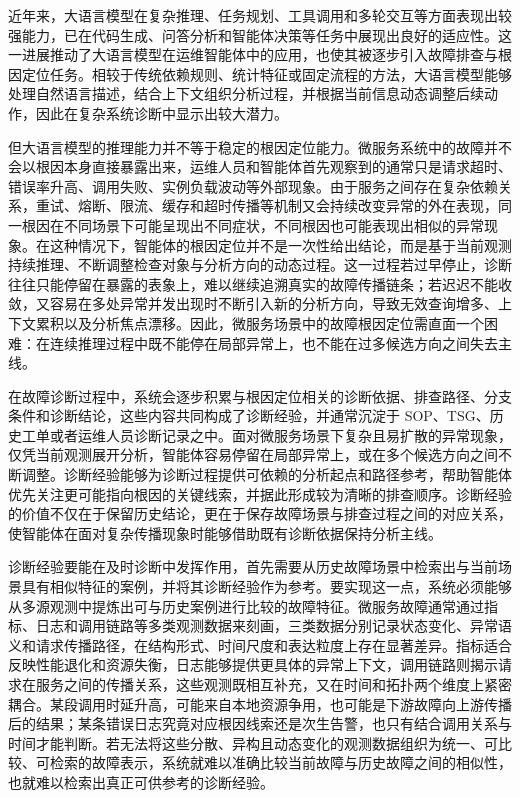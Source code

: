 近年来，大语言模型在复杂推理、任务规划、工具调用和多轮交互等方面表现出较强能力，已在代码生成、问答分析和智能体决策等任务中展现出良好的适应性\cite{yao2022react}。这一进展推动了大语言模型在运维智能体中的应用，也使其被逐步引入故障排查与根因定位任务。相较于传统依赖规则、统计特征或固定流程的方法，大语言模型能够处理自然语言描述，结合上下文组织分析过程，并根据当前信息动态调整后续动作，因此在复杂系统诊断中显示出较大潜力\cite{microservice-diagnosis-survey,wang2024rcagent}。

但大语言模型的推理能力并不等于稳定的根因定位能力。微服务系统中的故障并不会以根因本身直接暴露出来，运维人员和智能体首先观察到的通常只是请求超时、错误率升高、调用失败、实例负载波动等外部现象。由于服务之间存在复杂依赖关系，重试、熔断、限流、缓存和超时传播等机制又会持续改变异常的外在表现，同一根因在不同场景下可能呈现出不同症状，不同根因也可能表现出相似的异常现象。在这种情况下，智能体的根因定位并不是一次性给出结论，而是基于当前观测持续推理、不断调整检查对象与分析方向的动态过程。这一过程若过早停止，诊断往往只能停留在暴露的表象上，难以继续追溯真实的故障传播链条；若迟迟不能收敛，又容易在多处异常并发出现时不断引入新的分析方向，导致无效查询增多、上下文累积以及分析焦点漂移。因此，微服务场景中的故障根因定位需直面一个困难：在连续推理过程中既不能停在局部异常上，也不能在过多候选方向之间失去主线。


在故障诊断过程中，系统会逐步积累与根因定位相关的诊断依据、排查路径、分支条件和诊断结论，这些内容共同构成了诊断经验，并通常沉淀于 SOP、TSG、历史工单或者运维人员诊断记录之中。面对微服务场景下复杂且易扩散的异常现象，仅凭当前观测展开分析，智能体容易停留在局部异常上，或在多个候选方向之间不断调整。诊断经验能够为诊断过程提供可依赖的分析起点和路径参考，帮助智能体优先关注更可能指向根因的关键线索，并据此形成较为清晰的排查顺序。诊断经验的价值不仅在于保留历史结论，更在于保存故障场景与排查过程之间的对应关系，使智能体在面对复杂传播现象时能够借助既有诊断依据保持分析主线。

诊断经验要能在及时诊断中发挥作用，首先需要从历史故障场景中检索出与当前场景具有相似特征的案例，并将其诊断经验作为参考。要实现这一点，系统必须能够从多源观测中提炼出可与历史案例进行比较的故障特征。微服务故障通常通过指标、日志和调用链路等多类观测数据来刻画，三类数据分别记录状态变化、异常语义和请求传播路径，在结构形式、时间尺度和表达粒度上存在显著差异\cite{sridharan2018distributed,microservice-diagnosis-survey}。指标适合反映性能退化和资源失衡，日志能够提供更具体的异常上下文，调用链路则揭示请求在服务之间的传播关系，这些观测既相互补充，又在时间和拓扑两个维度上紧密耦合。某段调用时延升高，可能来自本地资源争用，也可能是下游故障向上游传播后的结果；某条错误日志究竟对应根因线索还是次生告警，也只有结合调用关系与时间才能判断。若无法将这些分散、异构且动态变化的观测数据组织为统一、可比较、可检索的故障表示，系统就难以准确比较当前故障与历史故障之间的相似性，也就难以检索出真正可供参考的诊断经验。

